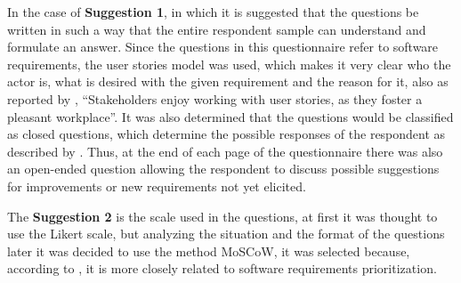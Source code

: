 In the case of \textbf{Suggestion 1}, in which it is suggested that the questions be written in such a way that the entire respondent sample can understand and formulate an answer.
Since the questions in this questionnaire refer to software requirements, the user stories model was used, which makes it very clear who the actor is, what is desired with the given requirement and the reason for it, also as reported by \textcite[p.220]{Lucassen_2016}, ``Stakeholders enjoy working with user stories, as they foster a pleasant workplace''.
It was also determined that the questions would be classified as closed questions, which determine the possible responses of the respondent as described by \textcite{forza}.
Thus, at the end of each page of the questionnaire there was also an open-ended question allowing the respondent to discuss possible suggestions for improvements or new requirements not yet elicited.


The \textbf{Suggestion 2} is the scale used in the questions, at first it was thought to use the Likert scale, but analyzing the situation and the format of the questions later it was decided to use the method \ac{MoSCoW}, it was selected because, according to \textcite{waters2009prioritization}, it is more closely related to software requirements prioritization.


